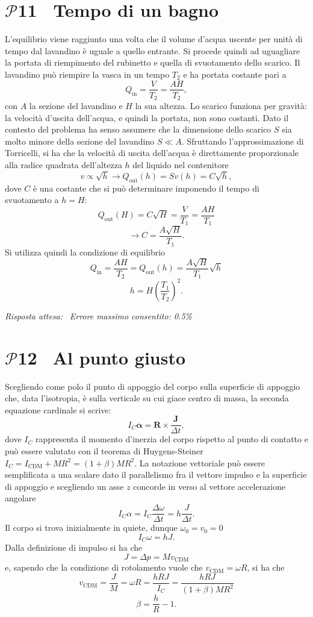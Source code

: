 \documentclass[a4paper,12pt]{article}
\newcommand{\problemtitle}[1]{
  \noindent
  \textbf{\Large #1}\hspace{0.5em}
  \raisebox{0.6ex}{\rule{\linewidth - \widthof{\textbf{\Large #1}} - 0.6em}{0.4pt}}%
}
\begin{document}
\section*{\problemtitle{$\mathcal{P}${\small{11}} \ Tempo di un bagno}}
L'equilibrio viene raggiunto una volta che il volume d'acqua uscente per unità di tempo dal lavandino è uguale a quello entrante. Si procede quindi ad uguagliare la portata di riempimento del rubinetto e quella di svuotamento dello scarico.
Il lavandino può riempire la vasca in un tempo $T_2$ e ha portata costante pari a 
\[
Q_{\text{in}} = \frac{V}{T_2} = \frac{AH}{T_2}, \tag{11.0}
\]
con $A$ la sezione del lavandino e $H$ la sua altezza. Lo scarico funziona per gravità: la velocità d'uscita dell'acqua, e quindi la portata, non sono costanti. Dato il contesto del problema ha senso assumere che la dimensione dello scarico $S$ sia molto minore della sezione del lavandino $S \ll A$. Sfruttando l'approssimazione di Torricelli, si ha che la velocità di uscita dell'acqua è direttamente proporzionale alla radice quadrata dell'altezza $h$ del liquido nel contenitore
\[
v \propto \sqrt{h} \rightarrow Q_{\text{out}}(h) = Sv(h) = C\sqrt{h}, \tag{11.1}
\]
dove $C$ è una costante che si può determinare imponendo il tempo di svuotamento a $h = H$:
\[
Q_{\text{out}}(H) = C\sqrt{H} = \frac{V}{T_1} = \frac{AH}{T_1} \tag{11.2}
\]
\[
\rightarrow C = \frac{A\sqrt{H}}{T_1}. \tag{11.3}
\]
Si utilizza quindi la condizione di equilibrio
\[
Q_{\text{in}} = \frac{AH}{T_2} = Q_{\text{out}}(h) = \frac{A\sqrt{H}}{T_1}\sqrt{h} \tag{11.4}
\]
\[
h = H\left(\frac{T_1}{T_2}\right)^2. \tag{11.5}
\]

\textit{Risposta attesa:}  \, \textit{Errore massimo consentito: 0.5\%}


\section*{\problemtitle{$\mathcal{P}${\small{12}} \, Al punto giusto}}
Scegliendo come polo il punto di appoggio del corpo sulla superficie di appoggio che, data l'isotropia, è sulla verticale su cui giace centro di massa, la seconda equazione cardinale si scrive:
\[
I_C\boldsymbol{\alpha} = \mathbf{R} \times \frac{\mathbf{J}}{\Delta t}, \tag{12.0}
\]
dove $I_C$ rappresenta il momento d'inerzia del corpo rispetto al punto di contatto e può essere valutato con il teorema di Huygens-Steiner $I_C = I_{\text{CDM}}+MR^2 = (1+\beta)MR^2$. La notazione vettoriale può essere semplificata a una scalare dato il parallelismo fra il vettore impulso e la superficie di appoggio e scegliendo un asse $z$ concorde in verso al vettore accelerazione angolare
\[
I_C\alpha = I_C \frac{\Delta\omega}{\Delta t} = h \frac{J}{\Delta t}. \tag{12.1}
\] 
Il corpo si trova inizialmente in quiete, dunque $\omega_0 = v_0 = 0$
\[
I_C\omega = hJ. \tag{12.2}
\]
Dalla definizione di impulso si ha che 
\[
J = \Delta p = Mv_{\text{CDM}} \tag{12.3}
\]
e, sapendo che la condizione di rotolamento vuole che $v_{\text{CDM}} = \omega R$, si ha che 
\[
v_{\text{CDM}} = \frac{J}{M} = \omega R = \frac{hRJ}{I_C} = \frac{hRJ}{(1+\beta)MR^2} \tag{12.4}
\]
\[
\beta = \frac{h}{R} - 1 . \tag{12.5}
\]
\end{document}
